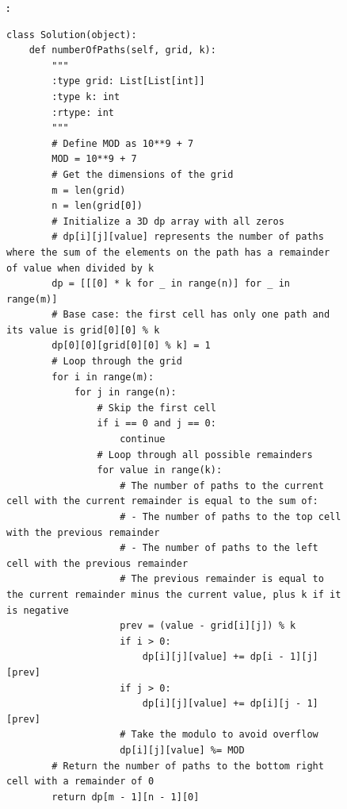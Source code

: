 \begin{figure}[H]
\begin{AIbox}{\DV}
{\bf \DV:}
\vspace{-0.1cm}
\begin{verbatim}
class Solution(object):
    def numberOfPaths(self, grid, k):
        """
        :type grid: List[List[int]]
        :type k: int
        :rtype: int
        """
        # Define MOD as 10**9 + 7
        MOD = 10**9 + 7
        # Get the dimensions of the grid
        m = len(grid)
        n = len(grid[0])
        # Initialize a 3D dp array with all zeros
        # dp[i][j][value] represents the number of paths where the sum of the elements on the path has a remainder of value when divided by k
        dp = [[[0] * k for _ in range(n)] for _ in range(m)]
        # Base case: the first cell has only one path and its value is grid[0][0] % k
        dp[0][0][grid[0][0] % k] = 1
        # Loop through the grid
        for i in range(m):
            for j in range(n):
                # Skip the first cell
                if i == 0 and j == 0:
                    continue
                # Loop through all possible remainders
                for value in range(k):
                    # The number of paths to the current cell with the current remainder is equal to the sum of:
                    # - The number of paths to the top cell with the previous remainder
                    # - The number of paths to the left cell with the previous remainder
                    # The previous remainder is equal to the current remainder minus the current value, plus k if it is negative
                    prev = (value - grid[i][j]) % k
                    if i > 0:
                        dp[i][j][value] += dp[i - 1][j][prev]
                    if j > 0:
                        dp[i][j][value] += dp[i][j - 1][prev]
                    # Take the modulo to avoid overflow
                    dp[i][j][value] %= MOD
        # Return the number of paths to the bottom right cell with a remainder of 0
        return dp[m - 1][n - 1][0]
\end{verbatim}

\end{AIbox}
\end{figure}
